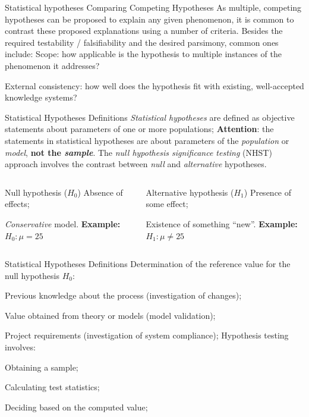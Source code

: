\documentclass[t]{beamer}
\begin{document}

\begin{ftst}
	{Statistical hypotheses}
	{Comparing Competing Hypotheses}
	As multiple, competing hypotheses can be proposed to explain any given phenomenon, it is common to contrast these proposed explanations using a number of criteria. 
	\vone
	Besides the required testability / falsifiability and the desired parsimony, common ones include:
	\vone
	\bitems Scope: how applicable is the hypothesis to multiple instances of the phenomenon it addresses?
	\item External consistency: how well does the hypothesis fit with existing, well-accepted knowledge systems?
	\eitem
\end{ftst}


\begin{ftst}
{Statistical Hypotheses}
{Definitions}
\textit{Statistical hypotheses} are defined as objective statements about parameters of one or more populations;
\vone
\textbf{Attention}: the statements in statistical hypotheses are about parameters of the \textit{population} or \textit{model}, \textbf{not the \textit{sample}}.
\vone
The \textit{null hypothesis significance testing} (NHST) approach involves the contrast between \textit{null} and \textit{alternative} hypotheses.
\begin{columns}[T]
	\begin{block}{Null hypothesis ($H_0$)}
	\small
	\bitems Absence of effects;
	\item \textit{Conservative} model.\eitem
	\textbf{Example:} $H_0: \mu = 25$
	\end{block}
	\begin{block}{Alternative hypothesis ($H_1$)}
	\small 
	\bitems Presence of some effect;
	\item Existence of something ``new''.\eitem
	\textbf{Example:} $H_1: \mu \neq 25$
		\end{block}
	\end{columns}
\end{ftst}


\begin{ftst}
{Statistical Hypotheses}
{Definitions}
Determination of the reference value for the null hypothesis $H_0$:

\bitems Previous knowledge about the process (investigation of changes);
	\item Value obtained from theory or models (model validation);
	\item Project requirements (investigation of system compliance);
\eitem
\vone
Hypothesis testing involves:

\bitems Obtaining a sample;
	\item Calculating test statistics;
	\item Deciding based on the computed value;
\eitem
\end{ftst}
\end{document}
